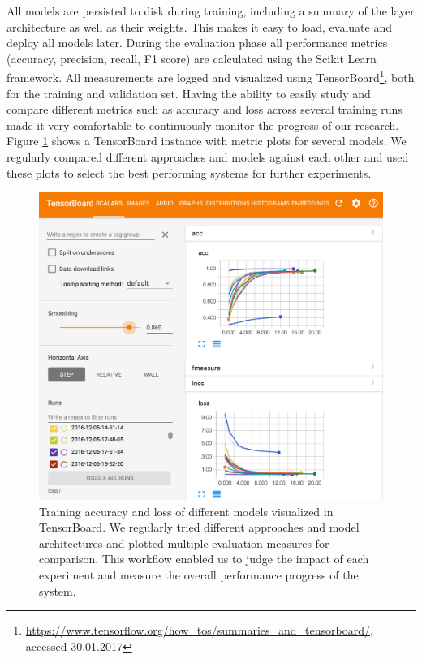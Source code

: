 	All models are persisted to disk during training, including a summary of the layer architecture as well as their weights. This makes it easy to load, evaluate and deploy all models later. During the evaluation phase all performance metrics (accuracy, precision, recall, F1 score) are calculated using the Scikit Learn\cite{scikit-learn} framework. All measurements are logged and visualized using TensorBoard\footnote{\url{https://www.tensorflow.org/how_tos/summaries_and_tensorboard/}, accessed 30.01.2017}, both for the training and validation set. Having the ability to easily study and compare different metrics such as accuracy and loss across several training runs made it very comfortable to continuously monitor the progress of our research. Figure \ref{fig:tensorboard} shows a TensorBoard instance with metric plots for several models. We regularly compared different approaches and models against each other and used these plots to select the best performing systems for further experiments.
	\begin{figure}[]
  		\centering
    	\includegraphics[width=\textwidth,keepaspectratio]{img/tensorboard.png}
    	\caption{Training accuracy and loss of different models visualized in TensorBoard. We regularly tried different approaches and model architectures and plotted multiple evaluation measures for comparison. This workflow enabled us to judge the impact of each experiment and measure the overall performance progress of the system.}
    	\label{fig:tensorboard}
	\end{figure}		
	
